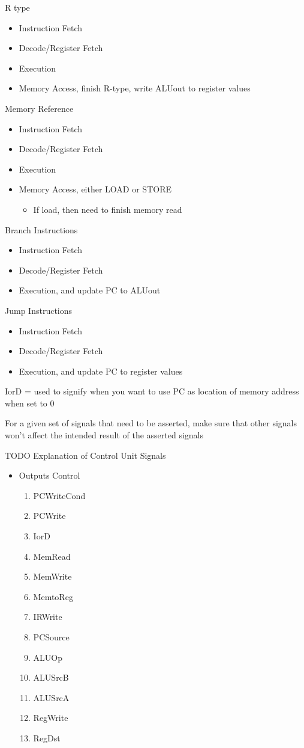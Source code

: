 \documentclass{article}
\begin{document}
		R type
		\begin{itemize}
			\item Instruction Fetch
			\item Decode/Register Fetch
			\item Execution 
			\item Memory Access, finish R-type, write ALUout to register values
		\end{itemize}

		Memory Reference
		\begin{itemize}
			\item Instruction Fetch
			\item Decode/Register Fetch
			\item Execution
			\item Memory Access, either LOAD or STORE
			\begin{itemize}
				\item If load, then need to finish memory read
			\end{itemize}
		\end{itemize}

		Branch Instructions
		\begin{itemize}
			\item Instruction Fetch
			\item Decode/Register Fetch
			\item Execution, and update PC to ALUout
		\end{itemize}

		Jump Instructions
		\begin{itemize}
			\item Instruction Fetch
			\item Decode/Register Fetch
			\item Execution, and update PC to register values
		\end{itemize}

		IorD = used to signify when you want to use PC as location of memory address when set to 0

		For a given set of signals that need to be asserted, make sure that other signals won't affect the intended result of the asserted signals

		TODO
		Explanation of Control Unit Signals
		\begin{itemize}
			\item Outputs Control
			\begin{enumerate}
				\item PCWriteCond
				\item PCWrite
				\item IorD
				\item MemRead
				\item MemWrite
				\item MemtoReg
				\item IRWrite
				\item PCSource
				\item ALUOp
				\item ALUSrcB
				\item ALUSrcA
				\item RegWrite
				\item RegDst
			\end{enumerate}
		\end{itemize}
		
\end{document}
